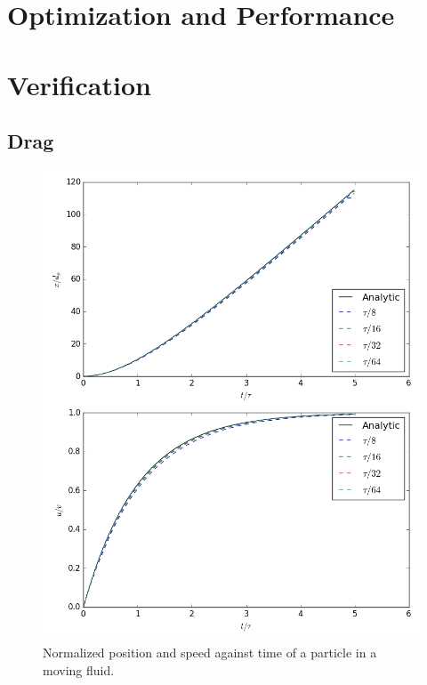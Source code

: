 \documentclass[10pt,a4paper,titlepage]{report}
\begin{document}
\section{Optimization and Performance}
\section{Verification}
\subsection{Drag}
\begin{figure}[!htb]
\centering
\includegraphics[scale=0.5]{figures/opencl_verification/drag_verification.png}
\caption{Normalized position and speed against time of a particle in a moving fluid.}
\label{fig:python_drag_verification}
\end{figure}
\end{document}
